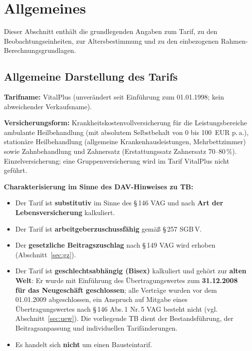 \section{Allgemeines}\label{sec:allgemeines}

Dieser Abschnitt enthält die grundlegenden Angaben zum Tarif, zu den
Beobachtungseinheiten, zur Altersbestimmung und zu den einbezogenen
Rahmen-Berechnungsgrundlagen.

\subsection{Allgemeine Darstellung des Tarifs}\label{sec:tarifdarstellung}

\textbf{Tarifname:} VitalPlus (unverändert seit Einführung zum
01.01.1998; kein abweichender Verkaufsname).

\textbf{Versicherungsform:} Krankheitskostenvollversicherung für die
Leistungsbereiche ambulante Heilbehandlung (mit absolutem Selbstbehalt
von 0 bis 100~EUR p.\,a.), stationäre Heilbehandlung (allgemeine
Krankenhausleistungen, Mehrbettzimmer) sowie Zahnbehandlung und
Zahnersatz (Erstattungssatz Zahnersatz 70--80\,\%). Einzelversicherung;
eine Gruppenversicherung wird im Tarif VitalPlus nicht geführt.

\textbf{Charakterisierung im Sinne des DAV-Hinweises zu TB:}
\begin{itemize}\itemsep2pt
  \item Der Tarif ist \textbf{substitutiv} im Sinne des \S\,146 VAG und
        nach \textbf{Art der Lebensversicherung} kalkuliert.
  \item Der Tarif ist \textbf{arbeitgeberzuschussfähig} gemäß
        \S\,257 SGB\,V.
  \item Der \textbf{gesetzliche Beitragszuschlag} nach \S\,149 VAG wird
        erhoben (Abschnitt~\ref{sec:gz}).
  \item Der Tarif ist \textbf{geschlechtsabhängig (Bisex)} kalkuliert und
        gehört zur \textbf{alten Welt}: Er wurde mit Einführung des
        Übertragungswertes zum \textbf{31.12.2008 für das Neugeschäft
        geschlossen}; alle Verträge wurden vor dem 01.01.2009
        abgeschlossen, ein Anspruch auf Mitgabe eines
        Übertragungswertes nach \S\,146 Abs.\,1 Nr.\,5 VAG besteht
        nicht (vgl. Abschnitt~\ref{sec:uew}). Die vorliegende TB dient
        der Bestandsführung, der Beitragsanpassung und individuellen
        Tarifänderungen.
  \item Es handelt sich \textbf{nicht} um einen Bausteintarif.
\end{itemize}

